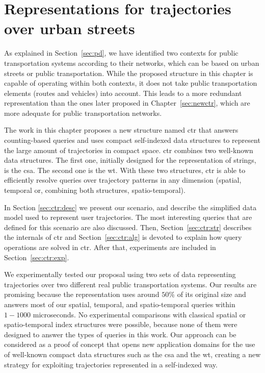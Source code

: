 \chapter{Representations for trajectories over urban streets}
\label{sec:ctr}
	As explained in Section~\ref{sec:pd}, we have identified two contexts for public transportation systems according to their networks, which can be based on urban streets or public transportation. While the proposed structure in this chapter is capable of operating within both contexts, it does not take public transportation elements (routes and vehicles) into account. This leads to a more redundant representation than the ones later proposed in Chapter~\ref{sec:newctr}, which are more adequate for public transportation networks.
	
	The work in this chapter proposes a new structure named \acrfull{ctr} that answers  counting-based queries and uses compact self-indexed data structures to represent the large amount of trajectories in compact space.
	\gls{ctr} combines two well-known data structures. The first one,
	initially designed for the representation of strings, is the
	\gls{csa}. The second
	one is the \gls{wt}. With these two structures, \gls{ctr} is able to efficiently resolve queries over trajectory patterns in any dimension (spatial, temporal or, combining both structures, spatio-temporal).

    In Section \ref{sec:ctr:desc} we present our scenario, and describe the simplified data model used to represent user trajectories. The most interesting queries that are defined for this scenario are also discussed. Then, Section~\ref{sec:ctr:str} describes the internals of \gls{ctr} and Section~\ref{sec:ctr:alg} is devoted to explain how query operations are solved in \gls{ctr}. After that, experiments are included in Section~\ref{sec:ctr:exp}.

	We experimentally tested our proposal using two sets of %
	data representing trajectories over two different real public
	transportation systems. Our results are promising because the
	representation uses around  $50$\% of its original size and
	answers most of our spatial, temporal,  and spatio-temporal queries within $1\!-\!1000$ microseconds. 
	No experimental comparisons with classical spatial or spatio-temporal
	index structures were possible, because none of them were designed to
	answer the types of queries in this work. Our approach can  be
	considered as a proof of concept that opens new application
	domains for the use of well-known compact data structures such as the
	\gls{csa} and the \gls{wt}, creating a new strategy for
	exploiting trajectories represented in a self-indexed way.
	
